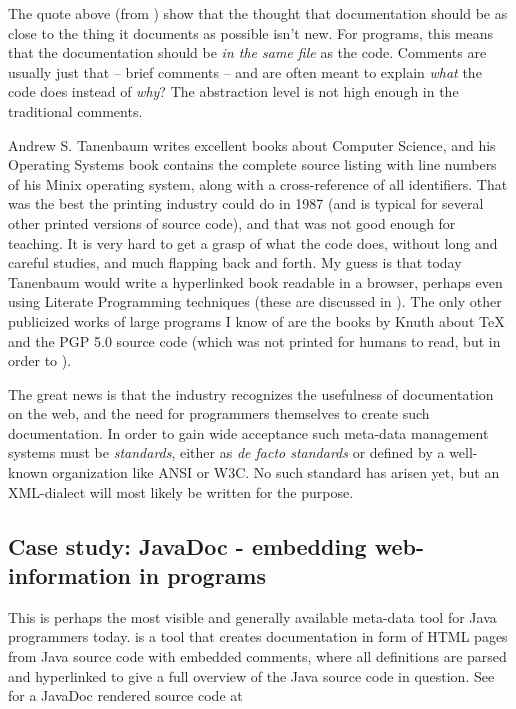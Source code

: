 The quote above (from \cite{brooks:the-mythical-man-month}) show that
the thought that documentation should be as close to the thing it
documents as possible isn't new.  For programs, this means that the
documentation should be \textit{in the same file} as the code.
Comments are usually just that -- brief comments -- and are often
meant to explain \textit{what} the code does instead of \textit{why}?
The abstraction level is not high enough in the traditional comments.

Andrew S. Tanenbaum writes excellent books about Computer Science, and
his Operating Systems book \cite{tanenbaumoperatingsystems} contains
the complete source listing with line numbers of his Minix operating
system, along with a cross-reference of all identifiers.  That was the
best the printing industry could do in 1987 (and is typical for
several other printed versions of source code), and that was not good
enough for teaching.  It is very hard to get a grasp of what the code
does, without long and careful studies, and much flapping back and
forth.  My guess is that today Tanenbaum would write a hyperlinked
book readable in a browser, perhaps even using Literate
Programming techniques (these are discussed in
).  The only other publicized
works of large programs I know of are the books by Knuth about {\TeX}
and the PGP 5.0 source code (which was not printed for humans to read,
but in order to ).

The great news is that the industry recognizes the
usefulness of documentation on the web, and the need for
programmers themselves to create such documentation.  In
order to gain wide acceptance such meta-data management
systems must be \textit{standards}, either as \textit{de
  facto standards} or defined by a well-known organization
like ANSI or W3C.  No such standard has arisen yet, but an
XML-dialect will most likely be written for the purpose.


\subsection{Case study: JavaDoc - embedding web-information in programs}
\label{sec:javadoc}


This is perhaps the most visible and generally available meta-data
tool for Java programmers today.
is a tool that creates documentation in form of HTML pages from Java
source code with embedded comments, where all definitions are parsed
and hyperlinked to give a full overview of the Java source code in
question.  See  for a JavaDoc rendered source
code at 

